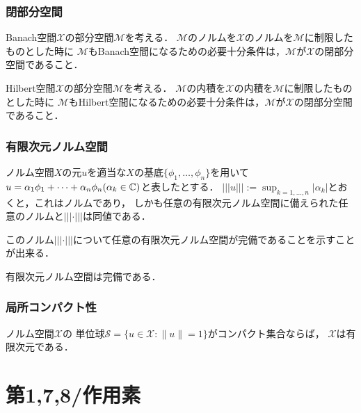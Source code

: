 \documentclass[a4j]{jarticle}
\newcommand{\spX}{\mathscr{X}}
\begin{document}
    \subsubsection{閉部分空間}
    \begin{Them}[定理1.28, p17] \label{them1:28}
        Banach空間$\spX$の部分空間$\mathscr{M}$を考える．
        $\mathscr{M}$のノルムを$\spX$のノルムを$\mathscr{M}$に制限したものとした時に
        $\mathscr{M}$もBanach空間になるための必要十分条件は，$\mathscr{M}$が$\spX$の閉部分空間であること．
    \end{Them}
    \begin{Cor}[系1.29, p.18] \label{cor1:29}
        Hilbert空間$\spX$の部分空間$\mathscr{M}$を考える．
        $\mathscr{M}$の内積を$\spX$の内積を$\mathscr{M}$に制限したものとした時に
        $\mathscr{M}$もHilbert空間になるための必要十分条件は，$\mathscr{M}$が$\spX$の閉部分空間であること．
    \end{Cor}

    \subsubsection{有限次元ノルム空間}
    \begin{Them}[補題1.38, p.22] \label{them1:38}
        ノルム空間$X$の元$u$を適当な$X$の基底$\{ \phi_1, \dots, \phi_n \}$を用いて
        $u=\alpha_1 \phi_1+\dots+\alpha_n \phi_n (\alpha_k \in \mathbb{C})$と表したとする．
        $||| u |||:=\sup_{k=1,\dots,n}{|\alpha_k|}$とおくと，これはノルムであり，
        しかも任意の有限次元ノルム空間に備えられた任意のノルムと$||| \cdot |||$は同値である．
    \end{Them}
    このノルム$||| \cdot |||$について任意の有限次元ノルム空間が完備であることを示すことが出来る．
    \begin{Them}[定理1.37, p.22] \label{them1:37}
        有限次元ノルム空間は完備である．
    \end{Them}

    \subsubsection{局所コンパクト性}
    \begin{Them}
        ノルム空間$\spX$の
        単位球$\mathcal{S}=\{u \in \spX : \|u\|=1\}$がコンパクト集合ならば，
        $\spX$は有限次元である．
    \end{Them}

    \section{第1,7,8/作用素}
\end{document}
